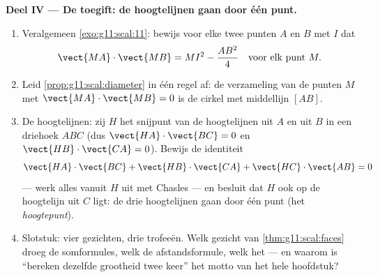 \begin{problem}
\medskip
\noindent\textbf{Deel IV --- De toegift: de hoogtelijnen gaan door één punt.}
\begin{enumerate}[resume]
  \item Veralgemeen \cref{exo:g11:scal:11}: bewijs voor elke twee punten $A$
        en $B$ met  $I$ dat
        \[
        \vect{MA} \cdot \vect{MB} = MI^2 - \frac{AB^2}{4}
        \quad\text{voor elk punt } M .
        \]
  \item Leid \cref{prop:g11:scal:diameter} in één regel af: de verzameling
        van de punten $M$ met $\vect{MA} \cdot \vect{MB} = 0$ is de cirkel
        met middellijn $[AB]$.
  \item De hoogtelijnen: zij $H$ het snijpunt van de hoogtelijnen uit $A$ en
        uit $B$ in een driehoek $ABC$ (dus $\vect{HA} \cdot \vect{BC} = 0$ en
        $\vect{HB} \cdot \vect{CA} = 0$). Bewijs de identiteit
        \[
        \vect{HA} \cdot \vect{BC} + \vect{HB} \cdot \vect{CA}
        + \vect{HC} \cdot \vect{AB} = 0
        \]
        --- werk alles vanuit $H$ uit met Chasles --- en besluit dat $H$ ook
        op de hoogtelijn uit $C$ ligt: de drie hoogtelijnen gaan door één
        punt (het \emph{hoogtepunt}).
  \item Slotstuk: vier gezichten, drie trofeeën. Welk gezicht van
        \cref{thm:g11:scal:faces} droeg de somformules, welk de
        afstandsformule, welk het  --- en waarom is ``bereken
        dezelfde grootheid twee keer'' het motto van het hele hoofdstuk?
\end{enumerate}
\end{problem}
